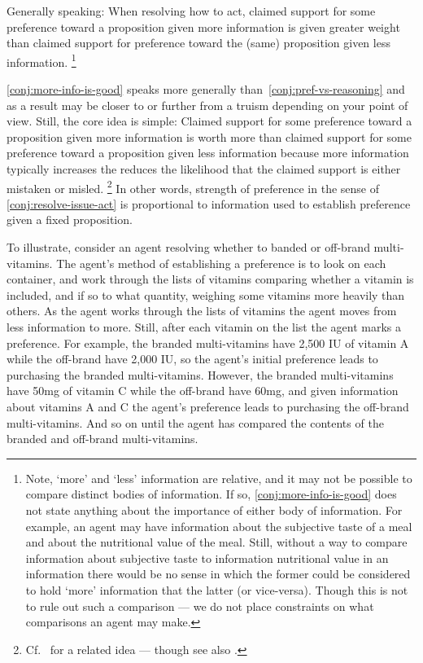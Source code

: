 \begin{note}
  \begin{conjecture}\label{conj:more-info-is-good}
    Generally speaking: When resolving how to act, claimed support for some preference toward a proposition given more information is given greater weight than claimed support for preference toward the (same) proposition given less information.\nolinebreak
  \footnote{
    Note, `more' and `less' information are relative, and it may not be possible to compare distinct bodies of information.
    If so, \autoref{conj:more-info-is-good} does not state anything about the importance of either body of information.
    For example, an agent may have information about the subjective taste of a meal and about the nutritional value of the meal.
    Still, without a way to compare information about subjective taste to information nutritional value in an information there would be no sense in which the former could be considered to hold `more' information that the latter (or vice-versa).
    Though this is not to rule out such a comparison --- we do not place constraints on what comparisons an agent may make.
  }
\end{conjecture}

  \autoref{conj:more-info-is-good} speaks more generally than~\autoref{conj:pref-vs-reasoning} and as a result may be closer to or further from a truism depending on your point of view.
  Still, the core idea is simple:
  Claimed support for some preference toward a proposition given more information is worth more than claimed support for some preference toward a proposition given less information because more information typically increases the reduces the likelihood that the claimed support is either mistaken or misled.\nolinebreak
  \footnote{
    Cf.\ \cite{Good:1966wx} for a related idea --- though see also \cite{Bradley:2016wo}.
  }
  In other words, strength of preference in the sense of \autoref{conj:resolve-issue-act} is proportional to information used to establish preference given a fixed proposition.

  To illustrate, consider an agent resolving whether to banded or off-brand multi-vitamins.
  The agent's method of establishing a preference is to look on each container, and work through the lists of vitamins comparing whether a vitamin is included, and if so to what quantity, weighing some vitamins more heavily than others.
  As the agent works through the lists of vitamins the agent moves from less information to more.
  Still, after each vitamin on the list the agent marks a preference.
  For example, the branded multi-vitamins have 2,500 IU of vitamin A while the off-brand have 2,000 IU, so the agent's initial preference leads to purchasing the branded multi-vitamins.
  However, the branded multi-vitamins have 50mg of vitamin C while the off-brand have 60mg, and given information about vitamins A and C the agent's preference leads to purchasing the off-brand multi-vitamins.
  And so on until the agent has compared the contents of the branded and off-brand multi-vitamins.


\end{note}
